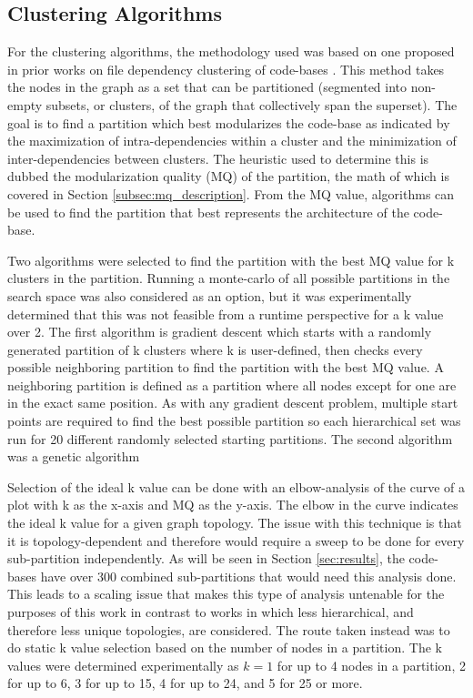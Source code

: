 \subsection{Clustering Algorithms}
\label{subsec:alg_description}

For the clustering algorithms, the methodology used was based on one proposed in prior works on file dependency clustering of code-bases \cite{792498_bunch, 693283_auto_clustering}. This method takes the nodes in the graph as a set that can be partitioned (segmented into non-empty subsets, or clusters, of the graph that collectively span the superset). The goal is to find a partition which best modularizes the code-base as indicated by the maximization of intra-dependencies within a cluster and the minimization of inter-dependencies between clusters. The heuristic used to determine this is dubbed the modularization quality (MQ) of the partition, the math of which is covered in Section \ref{subsec:mq_description}. From the MQ value, algorithms can be used to find the partition that best represents the architecture of the code-base.

Two algorithms were selected to find the partition with the best MQ value for k clusters in the partition. Running a monte-carlo of all possible partitions in the search space was also considered as an option, but it was experimentally determined that this was not feasible from a runtime perspective for a k value over 2. The first algorithm is gradient descent which starts with a randomly generated partition of k clusters where k is user-defined, then checks every possible neighboring partition to find the partition with the best MQ value. A neighboring partition is defined as a partition where all nodes except for one are in the exact same position. As with any gradient descent problem, multiple start points are required to find the best possible partition so each hierarchical set was run for 20 different randomly selected starting partitions. The second algorithm was a genetic algorithm 

Selection of the ideal k value can be done with an elbow-analysis of the curve of a plot with k as the x-axis and MQ as the y-axis. The elbow in the curve indicates the ideal k value for a given graph topology. The issue with this technique is that it is topology-dependent and therefore would require a sweep to be done for every sub-partition independently. As will be seen in Section \ref{sec:results}, the code-bases have over 300 combined sub-partitions that would need this analysis done. This leads to a scaling issue that makes this type of analysis untenable for the purposes of this work in contrast to works in which less hierarchical, and therefore less unique topologies, are considered. The route taken instead was to do static k value selection based on the number of nodes in a partition. The k values were determined experimentally as $k = 1$ for up to 4 nodes in a partition, 2 for up to 6, 3 for up to 15, 4 for up to 24, and 5 for 25 or more.

